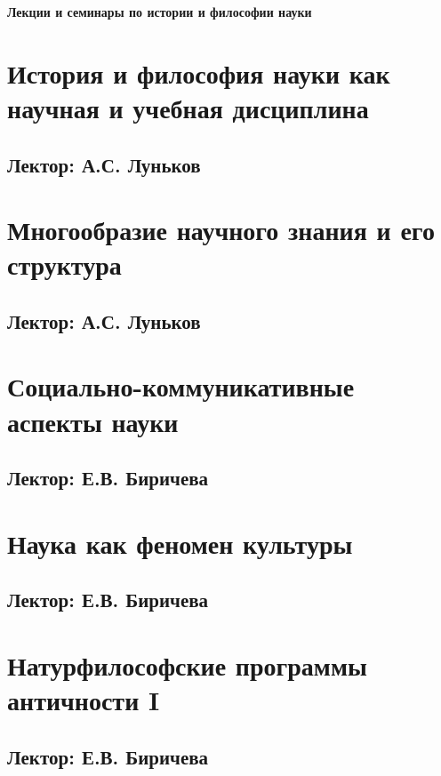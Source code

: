 \documentclass[a4paper, 12pt, notitlepage]{report}
\begin{document}
\begin{titlepage}
    \centering
    \vspace*{9cm}
    {\Huge \textbf{Лекции и семинары по истории и философии науки}}
    \vfill
\end{titlepage}

\tableofcontents

\chapter{История и философия науки как научная и учебная дисциплина}
\section*{Лектор: А.С. Луньков} 


\chapter{Многообразие научного знания и его структура}
\section*{Лектор: А.С. Луньков} 


\chapter{Социально-коммуникативные аспекты науки}
\section*{Лектор: Е.В. Биричева} 


\chapter{Наука как феномен культуры}
\section*{Лектор: Е.В. Биричева} 


\chapter{Натурфилософские программы античности I}
\section*{Лектор: Е.В. Биричева} 


\end{document}
